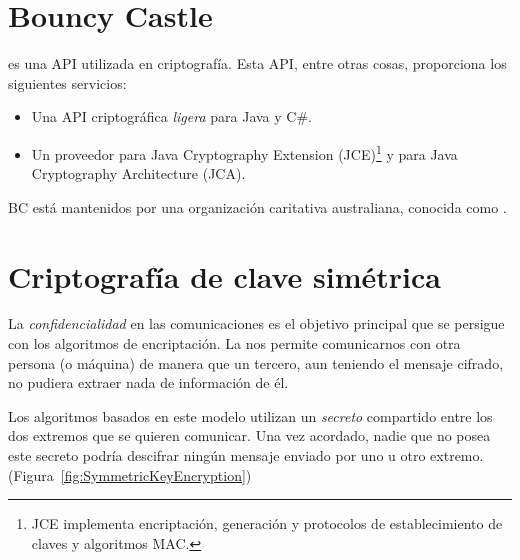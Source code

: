 
\section{Bouncy Castle}

 es una API utilizada en criptografía.
Esta API, entre otras cosas, proporciona los siguientes servicios:
\begin{itemize}
  \item Una API criptográfica \emph{ligera} para Java y C\#.
  \item Un proveedor para Java Cryptography Extension (JCE)\footnote{JCE implementa encriptación, generación y protocolos de establecimiento de claves y algoritmos MAC.} y para Java Cryptography Architecture (JCA).
\end{itemize}

BC está mantenidos por una organización caritativa australiana, conocida como . \emph{\parencite{Reference4}}


\section{Criptografía de clave simétrica}

La \emph{confidencialidad} en las comunicaciones es el objetivo principal que se persigue con los algoritmos de encriptación.
La  nos permite comunicarnos con otra persona (o máquina) de manera que un tercero,
aun teniendo el mensaje cifrado, no pudiera extraer nada de información de él.

Los algoritmos basados en este modelo utilizan un \emph{secreto} compartido entre los dos extremos que se quieren comunicar.
Una vez acordado, nadie que no posea este secreto podría descifrar ningún mensaje enviado por uno u otro extremo.
(Figura~\ref{fig:SymmetricKeyEncryption})

